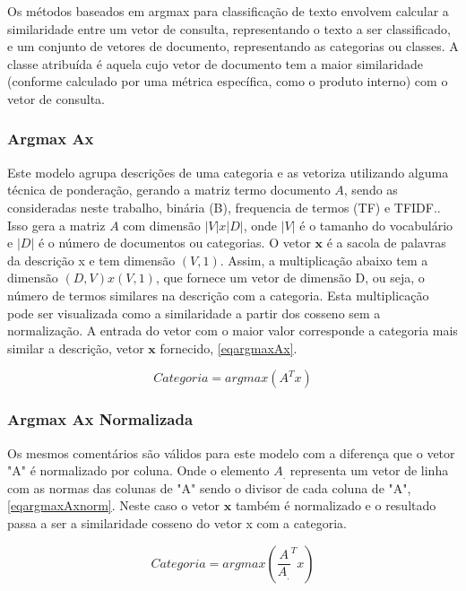 Os métodos baseados em argmax para classificação de texto envolvem calcular a similaridade entre um vetor de consulta, representando o texto a ser classificado, e um conjunto de vetores de documento, representando as categorias ou classes. A classe atribuída é aquela cujo vetor de documento tem a maior similaridade (conforme calculado por uma métrica específica, como o produto interno) com o vetor de consulta. 

\subsubsection*{Argmax Ax}\label{sec:argmaxAx}

Este modelo agrupa descrições de uma categoria e as vetoriza utilizando alguma técnica de ponderação, gerando a matriz termo documento $A$, sendo as consideradas neste trabalho, binária (B), frequencia de termos (TF) e TFIDF.. Isso gera a matriz $A$ com dimensão $|V|x|D|$, onde $|V|$ é o tamanho do vocabulário e $|D|$ é o número de documentos ou categorias.  O vetor $\mathbf{x}$ é a sacola de palavras da descrição x e tem dimensão $(V,1)$. Assim, a multiplicação abaixo tem a dimensão $(D,V)x(V,1)$, que fornece um vetor de dimensão D, ou seja, o número de termos similares na descrição com a categoria.  Esta multiplicação pode ser visualizada como a similaridade a partir dos cosseno sem a normalização.  A entrada do vetor com o maior valor corresponde a categoria mais similar a descrição, vetor $\mathbf{x}$ fornecido, \ref{eqargmaxAx}.

\begin{equation}
\label{eqargmaxAx}
Categoria = argmax(A^Tx)
\end{equation}

\subsubsection*{Argmax Ax Normalizada}\label{sec:argmaxAxnorm}

Os mesmos comentários são válidos para este modelo com a diferença que o vetor "A" é normalizado por coluna. Onde o elemento $A_.$ representa um vetor de linha com as normas das colunas de "A" sendo o divisor de cada coluna de "A", \ref{eqargmaxAxnorm}.  Neste caso o vetor $\mathbf{x}$ também é normalizado e o resultado passa a ser a similaridade cosseno do vetor x com a categoria.

\begin{equation}
\label{eqargmaxAxnorm}
Categoria = argmax(\frac{A}{A_.}^Tx)
\end{equation}

